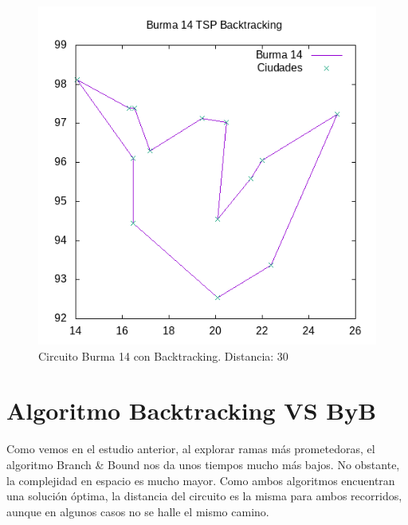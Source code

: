 \documentclass{article}
\begin{document}
	\begin{figure}[H]
		\centering
		\includegraphics[totalheight=6cm]{burma14back}
		\caption{Circuito Burma 14 con Backtracking. Distancia: 30}
		\label{fig:b14back}
	\end{figure}

	\section{Algoritmo Backtracking VS ByB}
	Como vemos en el estudio anterior, al explorar ramas más prometedoras, el algoritmo Branch \& Bound nos da unos tiempos mucho más bajos. No obstante, la complejidad en espacio es mucho mayor. Como ambos algoritmos encuentran una solución óptima, la distancia del circuito es la misma para ambos recorridos, aunque en algunos casos no se halle el mismo camino.
	
\end{document}
